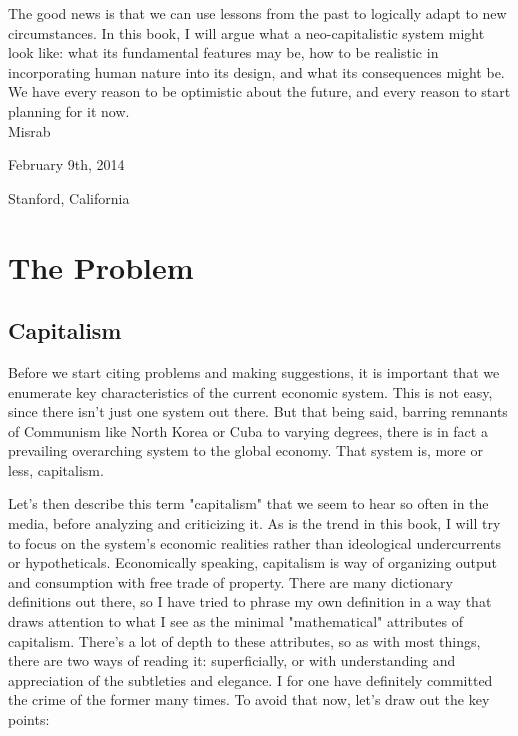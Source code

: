 \documentclass[12pt]{memoir}
\begin{document}
		The good news is that we can use lessons from the past to logically adapt to new circumstances. In this book, I will argue what a neo-capitalistic system might look like: what its fundamental features may 
		be, how to be realistic in incorporating human nature into its design, and what its consequences might be. We have every reason to be optimistic about the future, and every reason to start planning for it now.\\
	
		\hfill	Misrab
		
		\hfill	February 9th, 2014
		
		\hfill	Stanford, California
		
		
	\chapter{The Problem}
		\section{Capitalism}
			Before we start citing problems and making suggestions, it is important that we enumerate key characteristics of the current economic system. This is not easy, since there isn't just 
			one system out there. But that being said, barring remnants of Communism like North Korea or Cuba to varying degrees, there is in fact a prevailing overarching system to the global economy. That 
			system is, more or less, capitalism.\
			
			Let's then describe this term "capitalism" that we seem to hear so often in the media, before analyzing and criticizing it. As is the trend in this book, I will try to focus on the system's economic 
			realities rather than ideological undercurrents or hypotheticals. Economically speaking, capitalism is way of organizing output and consumption with free trade of property. There are many dictionary 
			definitions out there, so I have tried to phrase my own definition in a way that draws attention to what I see as the minimal "mathematical" attributes of capitalism. There's a lot of depth to these attributes, so as 
			with most things, there are two ways of reading it: superficially, or with understanding and appreciation of the subtleties and elegance. I for one have definitely committed 
			the crime of the former many times. To avoid that now, let's draw out the key points:
			
\end{document}
